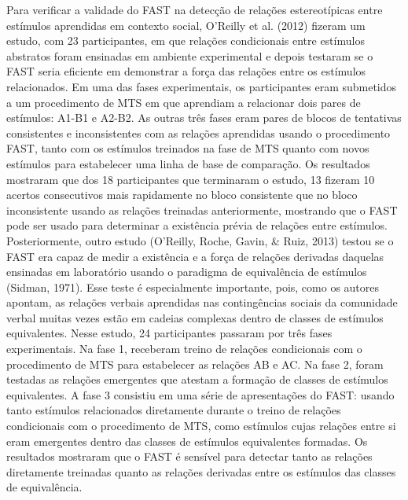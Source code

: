 Para verificar a validade do FAST na detecção de relações estereotípicas entre estímulos aprendidas em contexto social, O'Reilly et al. (2012) fizeram um estudo, com 23 participantes, em que relações condicionais entre estímulos abstratos foram ensinadas em ambiente experimental e depois testaram se o FAST seria eficiente em demonstrar a força das relações entre os estímulos relacionados. Em uma das fases experimentais, os participantes eram submetidos a um procedimento de MTS em que aprendiam a relacionar dois pares de estímulos: A1-B1 e A2-B2. As outras três fases eram pares de blocos de tentativas consistentes e inconsistentes com as relações aprendidas usando o procedimento FAST, tanto com os estímulos treinados na fase de MTS quanto com novos estímulos para estabelecer uma linha de base de comparação. Os resultados mostraram que dos 18 participantes que terminaram o estudo, 13 fizeram 10 acertos consecutivos mais rapidamente no bloco consistente que no bloco inconsistente usando as relações treinadas anteriormente, mostrando que o FAST pode ser usado para determinar a existência prévia de relações entre estímulos. Posteriormente, outro estudo (O'Reilly, Roche, Gavin, \& Ruiz, 2013) testou se o FAST era capaz de medir a existência e a força de relações derivadas daquelas ensinadas em laboratório usando o paradigma de equivalência de estímulos (Sidman, 1971). Esse teste é especialmente importante, pois, como os autores apontam, as relações verbais aprendidas nas contingências sociais da comunidade verbal muitas vezes estão em cadeias complexas dentro de classes de estímulos equivalentes. Nesse estudo, 24 participantes passaram por três fases experimentais. Na fase 1, receberam treino de relações condicionais com o procedimento de MTS para estabelecer as relações AB e AC. Na fase 2, foram testadas as relações emergentes que atestam a formação de classes de estímulos equivalentes. A fase 3 consistiu em uma série de apresentações do FAST: usando tanto estímulos relacionados diretamente durante o treino de relações condicionais com o procedimento de MTS, como estímulos cujas relações entre si eram emergentes dentro das classes de estímulos equivalentes formadas. Os resultados mostraram que o FAST é sensível para detectar tanto as relações diretamente treinadas quanto as relações derivadas entre os estímulos das classes de equivalência.

